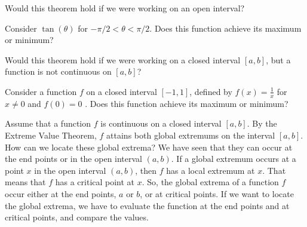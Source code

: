 \documentclass{ximera}
\begin{document}
\begin{question}
  Would this theorem hold if we were working on an open interval?
  \begin{prompt}
  \begin{multipleChoice}
  \end{multipleChoice}
  \begin{hint}
    Consider $\tan(\theta)$ for $-\pi/2 < \theta < \pi/2$. Does this function achieve its maximum or minimum? 
  \end{hint}
  \end{prompt}
  \end{question}

\begin{question}%
  Would this theorem hold if we were working on a closed interval
  $[a,b]$, but a function is not continuous on $[a,b]$?
  \begin{prompt}
    \begin{multipleChoice}
    \end{multipleChoice}
    \begin{hint}
      Consider a function $f$ on a closed interval $[-1,1]$, defined
      by $f(x)=\frac{1}{x}$ for $x\neq 0$ and $f(0)=0$ . Does this
      function achieve its maximum or minimum?
    \end{hint}
  \end{prompt}
\end{question}
Assume that a function $f$ is continuous on a closed interval
$[a,b]$. By the Extreme Value Theorem, $f$ attains both global
extremums on the interval $[a,b]$.  How can we locate these global
extrema? We have seen that they can occur at the end points or in the
open interval $(a,b)$.  If a global extremum occurs at a point $x$ in
the open interval $(a,b)$, then $f$ has a local extremum at $x$. That
means that $f$ has a critical point at $x$.  So, the global extrema of
a function $f$ occur either at the end points, $a$ or $b$, or at
critical points. If we want to locate the global extrema, we have to
evaluate the function at the end points and at critical points, and
compare the values.
\end{document}

